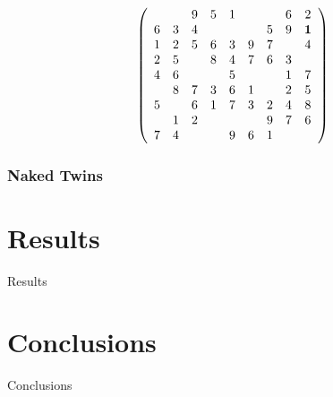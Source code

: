 \documentclass{article}
\begin{document}
\[ \left( \begin{array}{ccccccccc}
  &   & 9 & 5 & 1 &   &   & 6 & 2 \\
6 & 3 & 4 &   &   &   & 5 & 9 & {\bf 1} \\
1 & 2 & 5 & 6 & 3 & 9 & 7 &   & 4 \\
2 & 5 &   & 8 & 4 & 7 & 6 & 3 &   \\
4 & 6 &   &   & 5 &   &   & 1 & 7 \\
  & 8 & 7 & 3 & 6 & 1 &   & 2 & 5 \\
5 &   & 6 & 1 & 7 & 3 & 2 & 4 & 8 \\
  & 1 & 2 &   &   &   & 9 & 7 & 6 \\
7 & 4 &   &   & 9 & 6 & 1 &   &   \end{array}  \right)\]

\subsubsection{Naked Twins}

\section{Results}

Results

\section{Conclusions}

Conclusions



\end{document}
